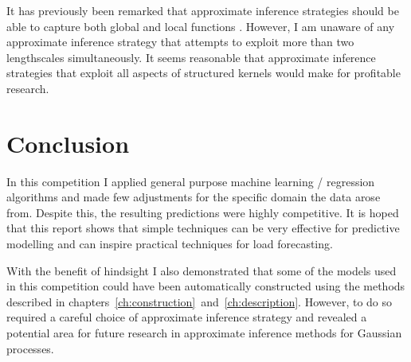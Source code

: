 It has previously been remarked that approximate inference strategies should be able to capture both global and local functions \citep[e.g.][]{Snelson2007-mj, Vanhatalo2012-yr}.
However, I am unaware of any approximate inference strategy that attempts to exploit more than two lengthscales simultaneously.
It seems reasonable that approximate inference strategies that exploit all aspects of structured kernels would make for profitable research.

\section{Conclusion}

In this competition I applied general purpose machine learning / regression algorithms and made few adjustments for the specific domain the data arose from.
Despite this, the resulting predictions were highly competitive.
It is hoped that this report shows that simple techniques can be very effective for predictive modelling and can inspire practical techniques for load forecasting.

With the benefit of hindsight I also demonstrated that some of the models used in this competition could have been automatically constructed using the methods described in chapters~\ref{ch:construction}~and~\ref{ch:description}.
However, to do so required a careful choice of approximate inference strategy and revealed a potential area for future research in approximate inference methods for Gaussian processes.

\outbpdocument{


}
